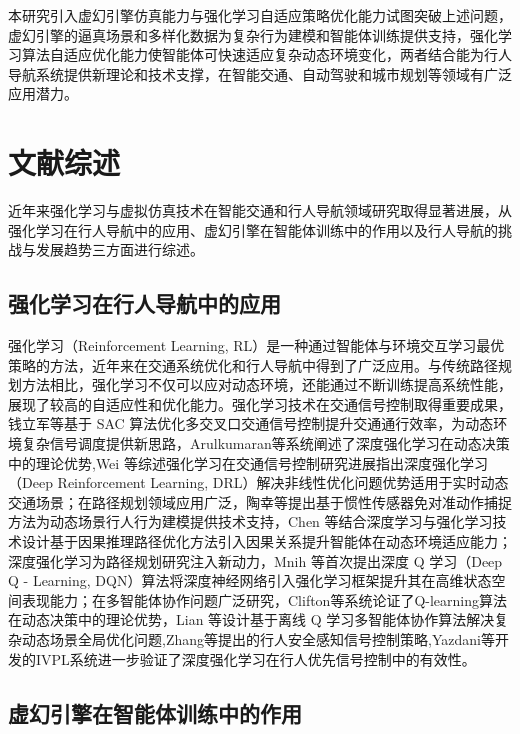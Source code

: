本研究引入虚幻引擎仿真能力与强化学习自适应策略优化能力试图突破上述问题，虚幻引擎的逼真场景和多样化数据为复杂行为建模和智能体训练提供支持，强化学习算法自适应优化能力使智能体可快速适应复杂动态环境变化，两者结合能为行人导航系统提供新理论和技术支撑，在智能交通、自动驾驶和城市规划等领域有广泛应用潜力。

\section{文献综述}

近年来强化学习与虚拟仿真技术在智能交通和行人导航领域研究取得显著进展，从强化学习在行人导航中的应用、虚幻引擎在智能体训练中的作用以及行人导航的挑战与发展趋势三方面进行综述。

\subsection{强化学习在行人导航中的应用}

强化学习（Reinforcement Learning, RL）是一种通过智能体与环境交互学习最优策略的方法，近年来在交通系统优化和行人导航中得到了广泛应用。与传统路径规划方法相比，强化学习不仅可以应对动态环境，还能通过不断训练提高系统性能，展现了较高的自适应性和优化能力。强化学习技术在交通信号控制取得重要成果，钱立军等\cite{qian2024sac}基于 SAC 算法优化多交叉口交通信号控制提升交通通行效率，为动态环境复杂信号调度提供新思路，Arulkumaran等\cite{arulkumaran2017deeprl}系统阐述了深度强化学习在动态决策中的理论优势,Wei 等\cite{wei2021survey}综述强化学习在交通信号控制研究进展指出深度强化学习（Deep Reinforcement Learning, DRL）解决非线性优化问题优势适用于实时动态交通场景；在路径规划领域应用广泛，陶幸等\cite{tao2024motion}提出基于惯性传感器免对准动作捕捉方法为动态场景行人行为建模提供技术支持，Chen 等\cite{chen2018ionet}结合深度学习与强化学习技术设计基于因果推理路径优化方法引入因果关系提升智能体在动态环境适应能力；深度强化学习为路径规划研究注入新动力，Mnih 等\cite{mnih2013dqn}首次提出深度 Q 学习（Deep Q - Learning, DQN）算法将深度神经网络引入强化学习框架提升其在高维状态空间表现能力；在多智能体协作问题广泛研究，Clifton等\cite{clifton2020qlearning}系统论证了Q-learning算法在动态决策中的理论优势，Lian 等\cite{lian2023inverseql}设计基于离线 Q 学习多智能体协作算法解决复杂动态场景全局优化问题,Zhang等\cite{zhang2019pedestrian}提出的行人安全感知信号控制策略,Yazdani等\cite{yazdani2023ivpl}开发的IVPL系统进一步验证了深度强化学习在行人优先信号控制中的有效性。

\subsection{虚幻引擎在智能体训练中的作用}

